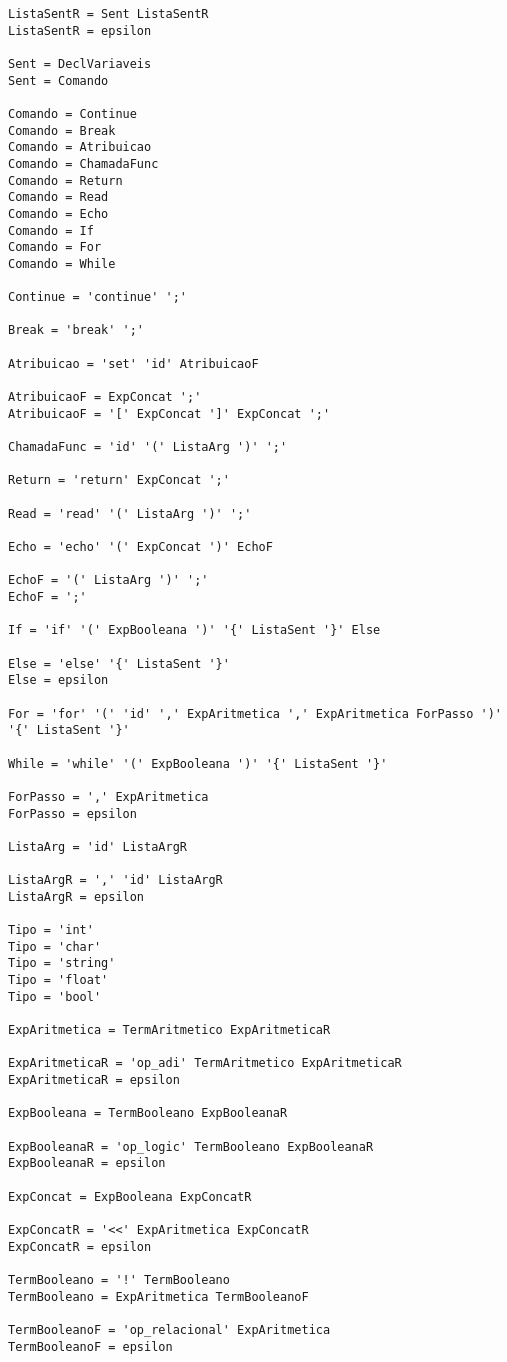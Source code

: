 \documentclass[
  12pt,				%
  oneside,			%
  a4paper,			%
  english,			%
  french,				%
  spanish,			%
  brazil,				%
]{abntex2}
\begin{document}
\begin{lstlisting}[label={code:gramatica-original},caption={Gramática
    original da linguagem de programação LisC.},style={mystyle}]
ListaSentR = Sent ListaSentR
ListaSentR = epsilon

Sent = DeclVariaveis
Sent = Comando

Comando = Continue
Comando = Break
Comando = Atribuicao
Comando = ChamadaFunc
Comando = Return
Comando = Read
Comando = Echo
Comando = If
Comando = For
Comando = While

Continue = 'continue' ';'

Break = 'break' ';'

Atribuicao = 'set' 'id' AtribuicaoF

AtribuicaoF = ExpConcat ';'
AtribuicaoF = '[' ExpConcat ']' ExpConcat ';'

ChamadaFunc = 'id' '(' ListaArg ')' ';'

Return = 'return' ExpConcat ';'

Read = 'read' '(' ListaArg ')' ';'

Echo = 'echo' '(' ExpConcat ')' EchoF

EchoF = '(' ListaArg ')' ';'
EchoF = ';'

If = 'if' '(' ExpBooleana ')' '{' ListaSent '}' Else

Else = 'else' '{' ListaSent '}'
Else = epsilon

For = 'for' '(' 'id' ',' ExpAritmetica ',' ExpAritmetica ForPasso ')' '{' ListaSent '}'

While = 'while' '(' ExpBooleana ')' '{' ListaSent '}'

ForPasso = ',' ExpAritmetica
ForPasso = epsilon

ListaArg = 'id' ListaArgR

ListaArgR = ',' 'id' ListaArgR
ListaArgR = epsilon

Tipo = 'int'
Tipo = 'char'
Tipo = 'string'
Tipo = 'float'
Tipo = 'bool'

ExpAritmetica = TermAritmetico ExpAritmeticaR

ExpAritmeticaR = 'op_adi' TermAritmetico ExpAritmeticaR
ExpAritmeticaR = epsilon

ExpBooleana = TermBooleano ExpBooleanaR

ExpBooleanaR = 'op_logic' TermBooleano ExpBooleanaR
ExpBooleanaR = epsilon

ExpConcat = ExpBooleana ExpConcatR

ExpConcatR = '<<' ExpAritmetica ExpConcatR
ExpConcatR = epsilon

TermBooleano = '!' TermBooleano
TermBooleano = ExpAritmetica TermBooleanoF

TermBooleanoF = 'op_relacional' ExpAritmetica
TermBooleanoF = epsilon


\end{lstlisting}
\end{document}
